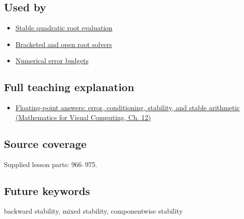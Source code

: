 \subsection{Used by}\label{appendix-aa2bf0d79639-used-by}

\hypertarget{appendix-aa2bf0d79639-used-by}{}

\begin{itemize}
\tightlist
\item
  \hyperref[appendix-b9afba7f63e5]{Stable quadratic root evaluation}
\item
  \hyperref[appendix-f63eb850796d]{Bracketed and open root solvers}
\item
  \hyperref[appendix-31b8c295e05f]{Numerical error budgets}
\end{itemize}

\subsection{Full teaching explanation}\label{appendix-aa2bf0d79639-full-teaching-explanation}

\hypertarget{appendix-aa2bf0d79639-full-teaching-explanation}{}

\begin{itemize}
\tightlist
\item
  \href{../02-Mathematics-for-Visual-Computing/main.pdf\#nameddest=02-foundations-ii-ch028-floating-point-answers-error-conditioning-stability-and-stable-arithmetic}{Floating-point answers: error, conditioning, stability, and stable arithmetic (Mathematics for Visual Computing, Ch. 12)}
\end{itemize}

\subsection{Source coverage}\label{appendix-aa2bf0d79639-source-coverage}

\hypertarget{appendix-aa2bf0d79639-source-coverage}{}

Supplied lesson parts: 966--975.

\subsection{Future keywords}\label{appendix-aa2bf0d79639-future-keywords}

\hypertarget{appendix-aa2bf0d79639-future-keywords}{}

backward stability, mixed stability, componentwise stability
